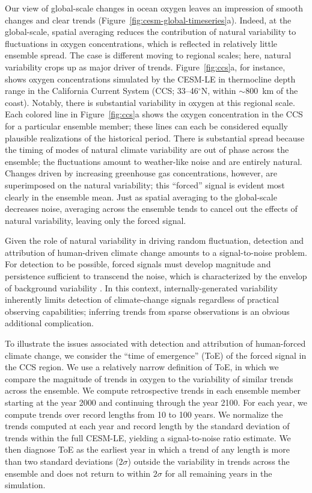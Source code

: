 \documentclass{report_chapter}
\begin{document}
Our view of global-scale changes in ocean oxygen leaves an impression of smooth changes and clear trends (Figure~\ref{fig:cesm-global-timeseries}a).
Indeed, at the global-scale, spatial averaging reduces the contribution of natural variability to fluctuations in oxygen concentrations, which is reflected in relatively little ensemble spread.
The case is different moving to regional scales; here, natural variability crops up as major driver of trends.
Figure~\ref{fig:ccs}a, for instance, shows oxygen concentrations simulated by the CESM-LE in thermocline depth range in the California Current System (CCS; 33--46$^\circ$N, within $\sim$800~km of the coast).
Notably, there is substantial variability in oxygen at this regional scale.
Each colored line in Figure~\ref{fig:ccs}a shows the oxygen concentration in the CCS for a particular ensemble member; these lines can each be considered equally plausible realizations of the historical period.
There is substantial spread because the timing of modes of natural climate variability are out of phase across the ensemble; the fluctuations amount to weather-like noise and are entirely natural.
Changes driven by increasing greenhouse gas concentrations, however, are superimposed on the natural variability; this ``forced'' signal is evident most clearly in the ensemble mean.
Just as spatial averaging to the global-scale decreases noise, averaging across the ensemble tends to cancel out the effects of natural variability, leaving only the forced signal.

Given the role of natural variability in driving random fluctuation, detection and attribution of human-driven climate change amounts to a signal-to-noise problem.
For detection to be possible, forced signals must develop magnitude and persistence sufficient to transcend the noise, which is characterized by the envelop of background variability \citep{Hasselmann-1993,Santer-Bruggemann-etal-1994,Santer-Mears-etal-2011}.
In this context, internally-generated variability inherently limits detection of climate-change signals regardless of practical observing capabilities; inferring trends from sparse observations is an obvious additional complication.

To illustrate the issues associated with detection and attribution of human-forced climate change, we consider the ``time of emergence'' (ToE) of the forced signal in the CCS region.
We use a relatively narrow definition of ToE, in which we compare the magnitude of trends in oxygen to the variability of similar trends across the ensemble.
We compute retrospective trends in each ensemble member starting at the year 2000 and continuing through the year 2100.
For each year, we compute trends over record lengths from 10 to 100 years.
We normalize the trends computed at each year and record length by the standard deviation of trends within the full CESM-LE, yielding a signal-to-noise ratio estimate.
We then diagnose ToE as the earliest year in which a trend of any length is more than two standard deviations ($2\sigma$) outside the variability in trends across the ensemble and does not return to within $2\sigma$ for all remaining years in the simulation.
\end{document}
